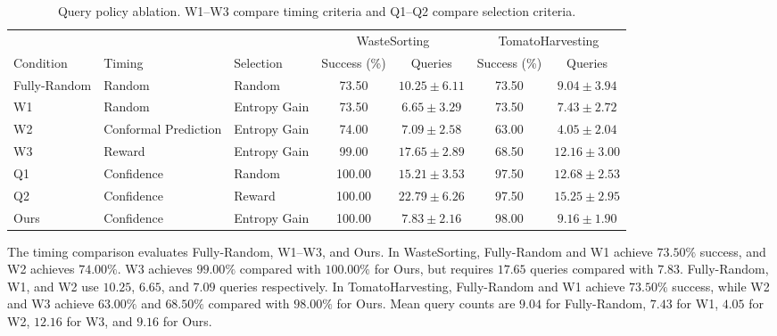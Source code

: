 \begin{table}[t]
\centering
\caption{Query policy ablation. W1--W3 compare timing criteria and Q1--Q2 compare selection criteria.}
\label{tab:policy_ablation}
\label{tab:when_what_random}
\small
\setlength{\tabcolsep}{4pt}
\begin{tabular}{lllcccc}
\toprule
 & & & \multicolumn{2}{c}{WasteSorting} & \multicolumn{2}{c}{TomatoHarvesting} \\
\cmidrule(lr){4-5}\cmidrule(lr){6-7}
Condition & Timing & Selection & Success (\%) & Queries & Success (\%) & Queries \\
\midrule
Fully-Random & Random & Random & 73.50 & $10.25 \pm 6.11$ & 73.50 & $9.04 \pm 3.94$ \\
W1 & Random & Entropy Gain & 73.50 & $6.65 \pm 3.29$ & 73.50 & $7.43 \pm 2.72$ \\
W2 & Conformal Prediction & Entropy Gain & 74.00 & $7.09 \pm 2.58$ & 63.00 & $4.05 \pm 2.04$ \\
W3 & Reward & Entropy Gain & 99.00 & $17.65 \pm 2.89$ & 68.50 & $12.16 \pm 3.00$ \\
Q1 & Confidence & Random & 100.00 & $15.21 \pm 3.53$ & 97.50 & $12.68 \pm 2.53$ \\
Q2 & Confidence & Reward & 100.00 & $22.79 \pm 6.26$ & 97.50 & $15.25 \pm 2.95$ \\
Ours & Confidence & Entropy Gain & 100.00 & $7.83 \pm 2.16$ & 98.00 & $9.16 \pm 1.90$ \\
\bottomrule
\end{tabular}
\end{table}

The timing comparison evaluates Fully-Random, W1--W3, and Ours. In WasteSorting, Fully-Random and W1 achieve $73.50\%$ success, and W2 achieves $74.00\%$. W3 achieves  $99.00\%$ compared with $100.00\%$ for Ours, but requires $17.65$ queries compared with $7.83$. Fully-Random, W1, and W2 use $10.25$, $6.65$, and $7.09$ queries respectively. In TomatoHarvesting, Fully-Random and W1 achieve $73.50\%$ success, while W2 and W3 achieve $63.00\%$ and $68.50\%$ compared with $98.00\%$ for Ours. Mean query counts are $9.04$ for Fully-Random, $7.43$ for W1, $4.05$ for W2, $12.16$ for W3, and $9.16$ for Ours.

